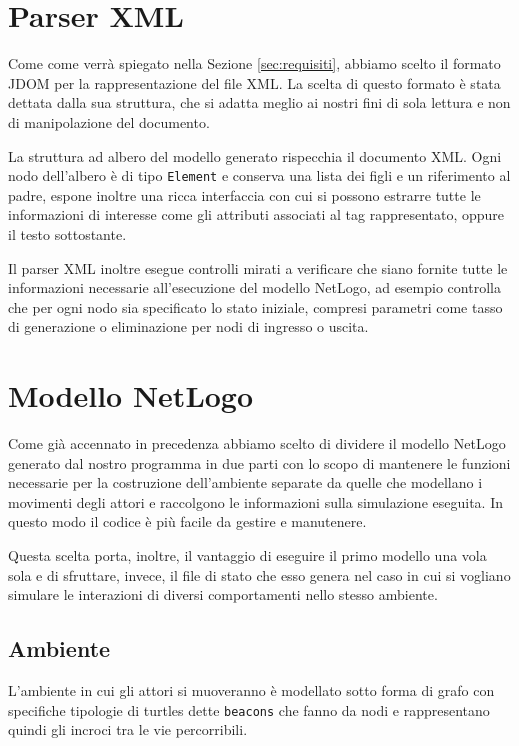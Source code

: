 \section{Parser XML}
\label{subsec:parser-builder}

Come come verrà spiegato nella Sezione \ref{sec:requisiti}, abbiamo scelto il formato JDOM per la rappresentazione del file XML. La scelta di questo formato è stata dettata dalla sua struttura, che si adatta meglio ai nostri fini di sola lettura e non di manipolazione del documento.

La struttura ad albero del modello generato rispecchia il documento XML. Ogni nodo dell'albero è di tipo \texttt{Element} e conserva una lista dei figli e un riferimento al padre, espone inoltre una ricca interfaccia con cui si possono estrarre tutte le informazioni di interesse come gli attributi associati al tag rappresentato, oppure il testo sottostante.

Il parser XML inoltre esegue controlli mirati a verificare che siano fornite tutte le informazioni necessarie all'esecuzione del modello NetLogo, ad esempio controlla che per ogni nodo sia specificato lo stato iniziale, compresi parametri come tasso di generazione o eliminazione per nodi di ingresso o uscita.


\section{Modello NetLogo}
\label{sec:modello-netlogo}

Come già accennato in precedenza abbiamo scelto di dividere il modello NetLogo generato dal nostro programma in due parti con lo scopo di mantenere le funzioni necessarie per la costruzione dell'ambiente separate da quelle che modellano i movimenti degli attori e raccolgono le informazioni sulla simulazione eseguita. In questo modo il codice è più facile da gestire e manutenere.

Questa scelta porta, inoltre, il vantaggio di eseguire il primo modello una vola sola e di sfruttare, invece, il file di stato che esso genera nel caso in cui si vogliano simulare le interazioni di diversi comportamenti nello stesso ambiente.
\subsection{Ambiente}
L'ambiente in cui gli attori si muoveranno è modellato sotto forma di grafo con specifiche tipologie di turtles dette \texttt{beacons} che fanno da nodi e rappresentano quindi gli incroci tra le vie percorribili.

